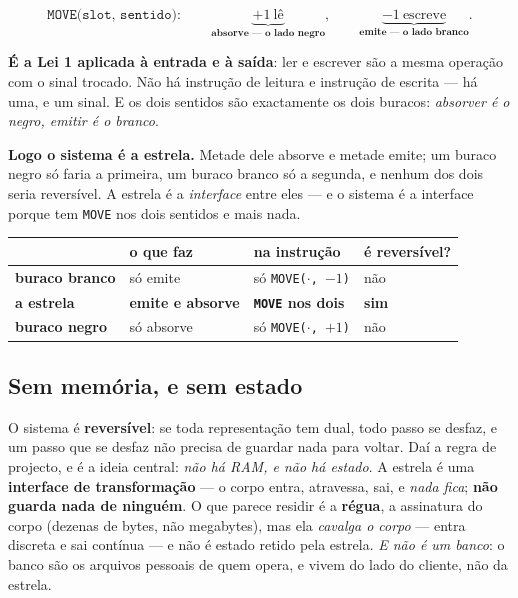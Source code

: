 \documentclass[11pt,a4paper]{article}
\newcommand{\code}[1]{\texttt{\small #1}}
\begin{document}
\[
  \texttt{MOVE(slot, sentido)} : \qquad
  \underbrace{+1 \ \text{lê}}_{\textbf{absorve --- o lado negro}}, \qquad
  \underbrace{-1 \ \text{escreve}}_{\textbf{emite --- o lado branco}} .
\]

\noindent \textbf{É a Lei 1 aplicada à entrada e à saída}: ler e escrever são a mesma operação com o
sinal trocado. Não há instrução de leitura e instrução de escrita --- há uma, e um sinal. E os dois
sentidos são exactamente os dois buracos: \emph{absorver é o negro, emitir é o branco}.

\smallskip
\noindent \textbf{Logo o sistema é a estrela.} Metade dele absorve e metade emite; um buraco negro
só faria a primeira, um buraco branco só a segunda, e nenhum dos dois seria reversível. A estrela é
a \emph{interface} entre eles --- e o sistema é a interface porque tem \code{MOVE} nos dois sentidos
e mais nada.

\begin{center}\small
\begin{tabular}{@{}llll@{}}
\toprule
 & o que faz & na instrução & é reversível? \\
\midrule
\textbf{buraco branco} & só emite & só \code{MOVE($\cdot$,\,$-1$)} & não \\
\textbf{a estrela} & \textbf{emite e absorve} & \textbf{\code{MOVE} nos dois} & \textbf{sim} \\
\textbf{buraco negro} & só absorve & só \code{MOVE($\cdot$,\,$+1$)} & não \\
\bottomrule
\end{tabular}
\end{center}

\subsection*{Sem memória, e sem estado}

O sistema é \textbf{reversível}: se toda representação tem dual, todo passo se desfaz, e um passo
que se desfaz não precisa de guardar nada para voltar. Daí a regra de projecto, e é a ideia central:
\emph{não há RAM, e não há estado}. A estrela é uma \textbf{interface de transformação} --- o corpo
entra, atravessa, sai, e \emph{nada fica}; \textbf{não guarda nada de ninguém}. O que parece residir
é a \textbf{régua}, a assinatura do corpo (dezenas de bytes, não megabytes), mas ela \emph{cavalga o
corpo} --- entra discreta e sai contínua --- e não é estado retido pela estrela. \emph{E não é um
banco}: o banco são os arquivos pessoais de quem opera, e vivem do lado do cliente, não da estrela.
\end{document}
